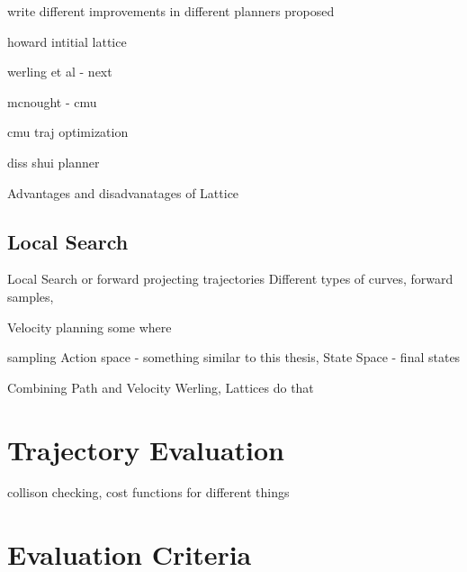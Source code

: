 write different improvements in different planners proposed

howard intitial lattice 

werling et al - next

mcnought - cmu 

cmu traj optimization

diss shui planner 

Advantages and disadvanatages of Lattice 

\subsection{Local Search}
\label{rw_local_search}

Local Search or forward projecting trajectories
Different types of curves, 
forward samples, 


Velocity planning some where

sampling
Action space - something similar to this thesis, 
State Space - final states

Combining Path and Velocity
Werling, Lattices do that







\section{Trajectory Evaluation}
\label{traj_eval}
collison checking, cost functions for different things


\section{Evaluation Criteria}


